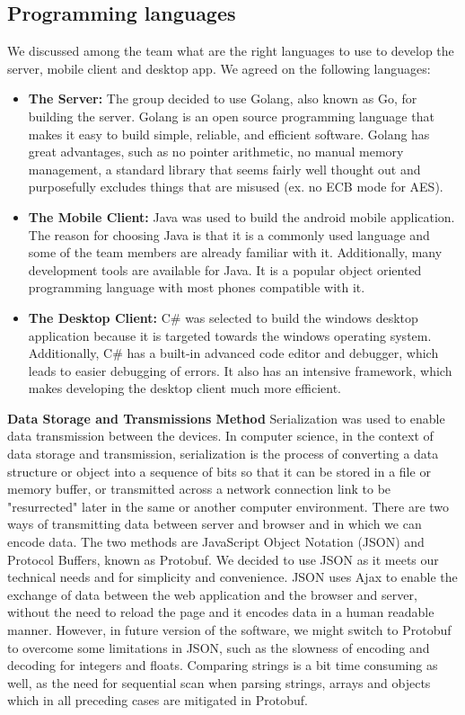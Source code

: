 \documentclass{article}
\begin{document}
\subsection{Programming languages}
We discussed among the team what are the right languages to use to develop the server, mobile client and desktop app. We agreed on the following languages:
\begin{itemize}
\item\textbf{The Server:} The group decided to use Golang, also known as Go, for building the server. Golang is an open source programming language that makes it easy to build simple, reliable, and efficient software. Golang has great advantages, such as no pointer arithmetic, no manual memory management, a standard library that seems fairly well thought out and purposefully excludes things that are misused (ex. no ECB mode for AES).
\item\textbf{The Mobile Client:} Java was used to build the android mobile application. The reason for choosing Java is that it is a commonly used language and some of the team members are already familiar with it. Additionally, many development tools are available for Java. It is a popular object oriented programming language with most phones compatible with it.
\item\textbf{The Desktop Client:} C\# was selected to build the windows desktop application because it is targeted towards the windows operating system. Additionally, C\# has a built-in advanced code editor and debugger, which leads to easier debugging of errors. It also has an intensive framework, which makes developing the desktop client much more efficient.
\end{itemize}

\hfill \break
\textbf{Data Storage and Transmissions Method}
Serialization was used to enable data transmission between the devices. In computer science, in the context of data storage and transmission, serialization is the process of converting a data structure or object into a sequence of bits so that it can be stored in a file or memory buffer, or transmitted across a network connection link to be "resurrected" later in the same or another computer environment. There are two ways of transmitting data between server and browser and in which we can encode data. The two methods are JavaScript Object Notation (JSON) and Protocol Buffers, known as Protobuf. We decided to use JSON as it meets our technical needs and for simplicity and convenience. JSON uses Ajax to enable the exchange of data between the web application and the browser and server, without the need to reload the page and it encodes data in a human readable manner. However, in future version of the software, we might switch to Protobuf to overcome some limitations in JSON, such as the slowness of encoding and decoding for integers and floats. Comparing strings is a bit time consuming as well, as the need for sequential scan when parsing strings, arrays and objects which in all preceding cases are mitigated in Protobuf.
\end{document}
